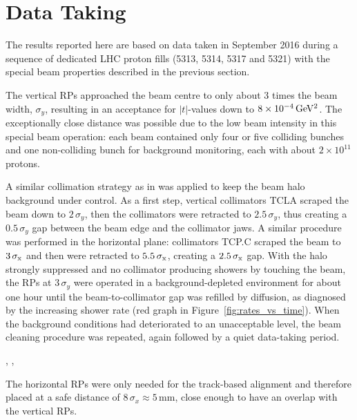 \section{Data Taking}
\label{sec:data taking}

The results reported here are based on data taken in September 2016 during a sequence of dedicated LHC proton fills (5313, 5314, 5317 and 5321) with the special beam properties described in the previous section.

The vertical RPs approached the beam centre to only about 3 times the beam width, $\sigma_{y}$, resulting in an acceptance for $|t|$-values down to $8 \times 10^{-4}\,\rm GeV^{2}$. The exceptionally close distance was possible due to the low beam intensity in this special beam operation: each beam contained only four or five colliding bunches and one non-colliding bunch for background monitoring, each with about $2\times 10^{11}$ protons.

A similar collimation strategy as in \cite{totem-8tev-1km} was applied to keep the beam halo background under control. As a first step, vertical collimators TCLA scraped the beam down to $2\,\sigma_{y}$, then the collimators were retracted to $2.5\,\sigma_{y}$, thus creating a $0.5\,\sigma_{y}$ gap between the beam edge and the collimator jaws. A similar procedure was performed in the horizontal plane: collimators TCP.C scraped the beam to $3\,{\rm \sigma_{x}}$ and then were retracted to $5.5\,{\rm \sigma_{x}}$, creating a $2.5\,{\rm \sigma_x}$ gap. With the halo strongly suppressed and no collimator producing showers by touching the beam, the RPs at $3\,\sigma_{y}$ were operated in a background-depleted environment for about one hour until the beam-to-collimator gap was refilled by diffusion, as diagnosed by the increasing shower rate (red graph in Figure~\ref{fig:rates_vs_time}). When the background conditions had deteriorated to an unacceptable level, the beam cleaning procedure was repeated, again followed by a quiet data-taking period.

,
,

The horizontal RPs were only needed for the track-based alignment and therefore placed at a safe distance of $8\,\sigma_{x} \approx 5$\,mm, close enough to have an overlap with the vertical RPs.

